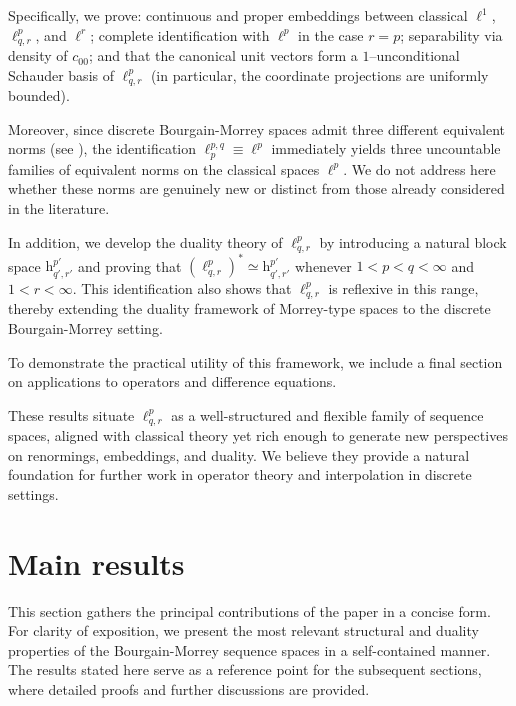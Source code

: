 \documentclass[preprint,12pt]{elsarticle}
\begin{document}
Specifically, we prove: continuous and proper embeddings between classical $\ell^1$, $\ell^{p}_{q,r}$, and $\ell^r$; complete identification with $\ell^p$ in the case $r=p$; separability via density of $c_{00}$; and that the canonical unit vectors form a $1$--unconditional Schauder basis of $\ell^{p}_{q,r}$ (in particular, the coordinate projections are uniformly bounded).

Moreover, since discrete Bourgain-Morrey spaces admit three different equivalent norms (see \cite{GuzmanSanMartinVillegas}), the identification $\ell^{p,q}_p \equiv \ell^p$ immediately yields three uncountable families of equivalent norms on the classical spaces $\ell^p$.  We do not address here whether these norms are genuinely new or distinct from those already considered in the literature.

In addition, we develop the duality theory of $\ell^{p}_{q,r}$ by introducing a natural block space $\mathrm{h}^{p'}_{q',r'}$ and proving that $(\ell^{p}_{q,r})^* \simeq \mathrm{h}^{p'}_{q',r'}$ whenever $1<p<q<\infty$ and $1<r<\infty$. This identification also shows that $\ell^{p}_{q,r}$ is reflexive in this range, thereby extending the duality framework of Morrey-type spaces to the discrete Bourgain-Morrey setting. 

To demonstrate the practical utility of this framework, we include a final section on applications to operators and difference equations.

These results situate $\ell^{p}_{q,r}$ as a well-structured and flexible family of sequence spaces, aligned with classical theory yet rich enough to generate new perspectives on renormings, embeddings, and duality. We believe they provide a natural foundation for further work in operator theory and interpolation in discrete settings.


\section{Main results}

This section gathers the principal contributions of the paper in a concise form. 
For clarity of exposition, we present the most relevant structural and duality 
properties of the Bourgain-Morrey sequence spaces in a self-contained manner. 
The results stated here serve as a reference point for the subsequent sections, 
where detailed proofs and further discussions are provided.
\end{document}
